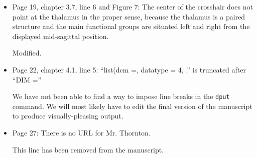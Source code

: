 \documentclass[11pt]{article}
\begin{document}
\begin{itemize}
\item Page 19, chapter 3.7, line 6 and Figure 7: The center of the
  crosshair does not point at the thalamus in the proper sense,
  because the thalamus is a paired structure and the main functional
  groups are situated left and right from the displayed mid-sagittal
  position.

  Modified.

\item Page 22, chapter 4.1, line 5: ``list(dcm =, datatype = 4, .'' is
  truncated after ``DIM =''

  We have not been able to find a way to impose line breaks in the
  \texttt{dput} command.  We will most likely have to edit the final
  version of the manuscript to produce visually-pleasing output.

\item Page 27: There is no URL for Mr. Thornton.

  This line has been removed from the manuscript.

\end{itemize}




\end{document}
